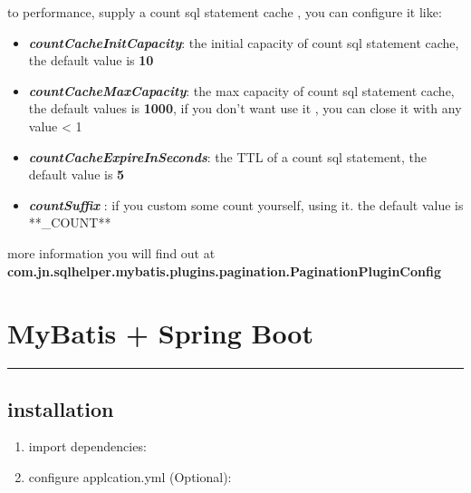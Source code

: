 \documentclass[
]{book}
\newenvironment{Shaded}{\begin{snugshade}}{\end{snugshade}}
\newcommand{\KeywordTok}[1]{\textcolor[rgb]{0.13,0.29,0.53}{\textbf{#1}}}
\newcommand{\NormalTok}[1]{#1}
\providecommand{\tightlist}{%
  \setlength{\itemsep}{0pt}\setlength{\parskip}{0pt}}
\begin{document}
to performance, supply a count sql statement cache , you can configure it like:

\begin{itemize}
\tightlist
\item
  \textbf{\emph{countCacheInitCapacity}}: the initial capacity of count sql statement cache, the default value is \textbf{10}
\item
  \textbf{\emph{countCacheMaxCapacity}}: the max capacity of count sql statement cache, the default values is \textbf{1000}, if you don't want use it , you can close it with any value \textless{} 1
\item
  \textbf{\emph{countCacheExpireInSeconds}}: the TTL of a count sql statement, the default value is \textbf{5}
\item
  \textbf{\emph{countSuffix}} : if you custom some count yourself, using it. the default value is **\_COUNT**
\end{itemize}

more information you will find out at \textbf{com.jn.sqlhelper.mybatis.plugins.pagination.PaginationPluginConfig}

\hypertarget{sqlhelper_mybatis_springboot}{%
\section{MyBatis + Spring Boot}\label{sqlhelper_mybatis_springboot}}

\begin{center}\rule{0.5\linewidth}{0.5pt}\end{center}

\hypertarget{sqlhelper_mybatis_springboot_installation}{%
\subsection{installation}\label{sqlhelper_mybatis_springboot_installation}}

\begin{enumerate}
\def\labelenumi{\arabic{enumi}.}
\item
  import dependencies:

\begin{Shaded}
\end{Shaded}
\item
  configure applcation.yml (Optional):
\end{enumerate}
\end{document}
